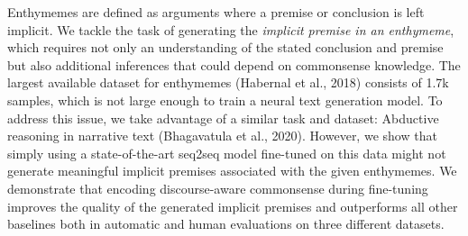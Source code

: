 Enthymemes are defined as arguments where a premise or conclusion is left implicit. We tackle the task of generating the \emph{implicit premise in an enthymeme}, which requires not only an understanding of the stated conclusion and premise but also additional inferences that could depend on commonsense knowledge. The largest available dataset for enthymemes (Habernal  et  al.,  2018)  consists of 1.7k samples, which is not large enough to train a neural text generation model. To address this issue, we take advantage of a similar task and dataset: Abductive reasoning in narrative text (Bhagavatula et al., 2020). However, we show that simply using a state-of-the-art seq2seq model fine-tuned on this data might not generate meaningful implicit premises associated with the given enthymemes.  We demonstrate that encoding discourse-aware commonsense during fine-tuning improves the quality of the generated implicit premises and outperforms all other baselines both in automatic and human evaluations on three different datasets.
